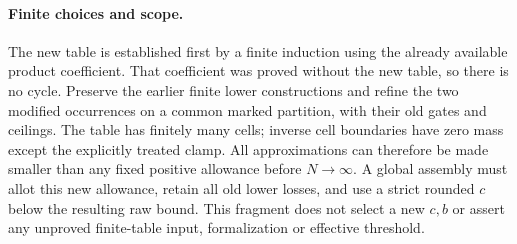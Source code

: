 \paragraph{Finite choices and scope.}
The new table is established first by a finite induction using the
already available product coefficient. That coefficient was proved
without the new table, so there is no cycle. Preserve the earlier
finite lower constructions and refine the two modified occurrences
on a common marked partition, with their old gates and ceilings.
The table has finitely many cells; inverse cell boundaries have zero
mass except the explicitly treated clamp. All approximations can
therefore be made smaller than any fixed positive allowance before
$N\to\infty$. A global assembly must allot this new allowance, retain
all old lower losses, and use a strict rounded $c$ below the resulting
raw bound. This fragment does not select a new $c,b$ or assert any
unproved finite-table input, formalization or effective threshold.
